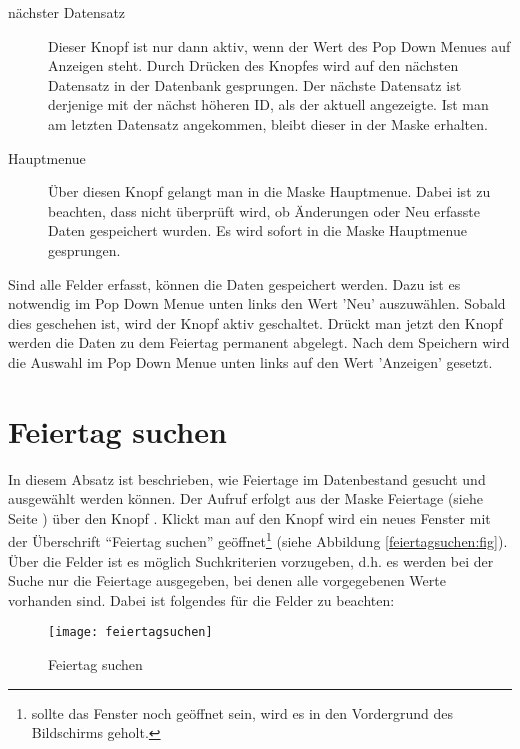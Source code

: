 \begin{description}
\item[nächster Datensatz] Dieser Knopf ist nur dann aktiv, wenn der Wert
des Pop Down Menues auf Anzeigen steht. Durch Drücken des Knopfes wird auf
den nächsten Datensatz in der Datenbank gesprungen. Der nächste Datensatz
ist derjenige mit der nächst höheren ID, als der aktuell angezeigte. Ist
man am letzten Datensatz angekommen, bleibt dieser in der Maske erhalten.
\item[Hauptmenue] Über diesen Knopf gelangt man in die Maske Hauptmenue.
Dabei ist zu beachten, dass nicht überprüft wird, ob Änderungen oder Neu
erfasste Daten gespeichert wurden. Es wird sofort in die Maske Hauptmenue
gesprungen.
\end{description}

Sind alle Felder erfasst, können die Daten gespeichert werden. Dazu ist
es notwendig im Pop Down Menue unten links den Wert 'Neu' auszuwählen.
Sobald dies geschehen ist, wird der Knopf  aktiv 
geschaltet. Drückt man jetzt den Knopf  werden die Daten
zu dem Feiertag permanent abgelegt. Nach dem Speichern wird die Auswahl im 
Pop Down Menue unten links auf den Wert 'Anzeigen' gesetzt.

\section{Feiertag suchen\label{feiertagsuchen:abs}}
In diesem Absatz ist beschrieben, wie Feiertage im Datenbestand gesucht und
ausgewählt werden können. Der  Aufruf erfolgt aus der 
Maske Feiertage (siehe Seite \pageref{feiertage:fig}) 
über den Knopf . 
Klickt man auf den Knopf  wird ein neues Fenster mit der
Überschrift ``Feiertag suchen'' geöffnet\footnote{sollte das Fenster 
noch geöffnet sein, wird es in den Vordergrund des Bildschirms geholt.} 
(siehe Abbildung \vref{feiertagsuchen:fig}). Über die Felder  ist es möglich 
Suchkriterien vorzugeben, d.h. es werden bei der Suche nur die Feiertage
ausgegeben, bei denen alle vorgegebenen Werte vorhanden sind. Dabei ist
folgendes für die Felder zu beachten:

\begin{figure}[ht]
\centering
\texttt{[image: feiertagsuchen]}
\caption{Feiertag suchen\label{feiertagsuchen:fig}}
\end{figure}

